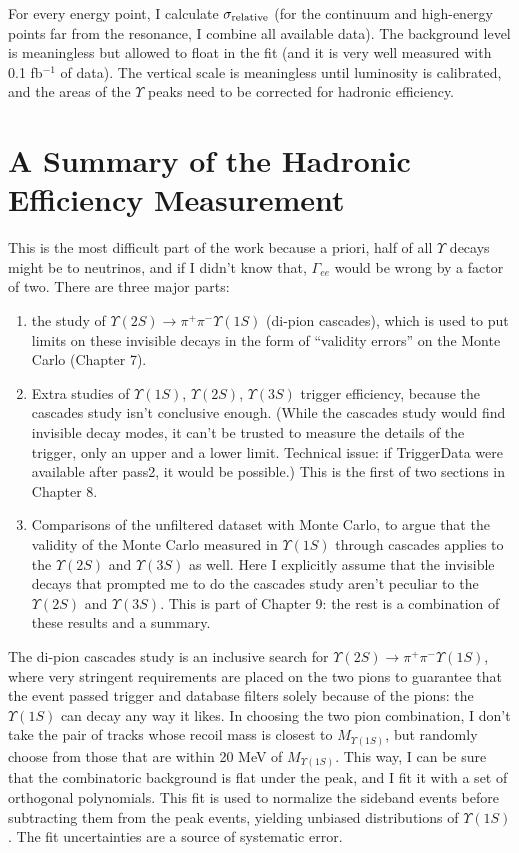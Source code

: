 \documentclass[12pt]{article}
\begin{document}
For every energy point, I calculate $\sigma_{\mbox{\scriptsize relative}}$ (for the
continuum and high-energy points far from the resonance, I combine all
available data).  The background level is meaningless but allowed to
float in the fit (and it is very well measured with 0.1 fb$^{-1}$ of
data).  The vertical scale is meaningless until luminosity is
calibrated, and the areas of the $\Upsilon$ peaks need to be corrected
for hadronic efficiency.

\section{A Summary of the Hadronic Efficiency Measurement}

This is the most difficult part of the work because a priori, half of
all $\Upsilon$ decays might be to neutrinos, and if I didn't know
that, $\Gamma_{ee}$ would be wrong by a factor of two.  There are
three major parts:
\begin{enumerate}
  \item the study of $\Upsilon(2S) \to \pi^+\pi^- \Upsilon(1S)$
    (di-pion cascades), which is used to put limits on these invisible
    decays in the form of ``validity errors'' on the Monte Carlo
    (Chapter 7).
  \item Extra studies of $\Upsilon(1S)$, $\Upsilon(2S)$,
    $\Upsilon(3S)$ trigger efficiency, because the cascades study
    isn't conclusive enough.  (While the cascades study would find
    invisible decay modes, it can't be trusted to measure the details
    of the trigger, only an upper and a lower limit.  Technical issue:
    if TriggerData were available after pass2, it would be possible.)
    This is the first of two sections in Chapter 8.
  \item Comparisons of the unfiltered dataset with Monte Carlo, to
    argue that the validity of the Monte Carlo measured in
    $\Upsilon(1S)$ through cascades applies to the $\Upsilon(2S)$ and
    $\Upsilon(3S)$ as well.  Here I explicitly assume that the
    invisible decays that prompted me to do the cascades study aren't
    peculiar to the $\Upsilon(2S)$ and $\Upsilon(3S)$.  This is part
    of Chapter 9: the rest is a combination of these results and a
    summary.
\end{enumerate}

The di-pion cascades study is an inclusive search for $\Upsilon(2S)
\to \pi^+\pi^- \Upsilon(1S)$, where very stringent requirements are
placed on the two pions to guarantee that the event passed trigger and
database filters solely because of the pions: the $\Upsilon(1S)$ can
decay any way it likes.  In choosing the two pion combination, I don't
take the pair of tracks whose recoil mass is closest to
$M_{\Upsilon(1S)}$, but randomly choose from those that are within 20
MeV of $M_{\Upsilon(1S)}$.  This way, I can be sure that the
combinatoric background is flat under the peak, and I fit it with a
set of orthogonal polynomials.  This fit is used to normalize the
sideband events before subtracting them from the peak events, yielding
unbiased distributions of $\Upsilon(1S)$.  The fit uncertainties are a
source of systematic error.
\end{document}
